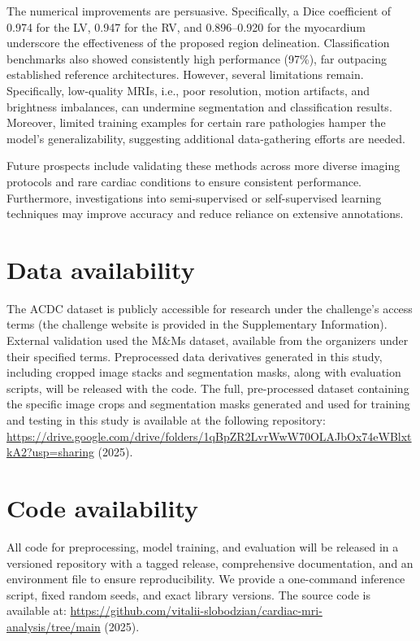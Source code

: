 \documentclass[fleqn,10pt]{wlscirep}
\begin{document}
The numerical improvements are persuasive. Specifically, a Dice coefficient of 0.974 for the LV, 0.947 for the RV, and 0.896--0.920 for the myocardium underscore the effectiveness of the proposed region delineation. Classification benchmarks also showed consistently high performance (97\%), far outpacing established reference architectures. However, several limitations remain. Specifically, low-quality MRIs, i.e., poor resolution, motion artifacts, and brightness imbalances, can undermine segmentation and classification results. Moreover, limited training examples for certain rare pathologies hamper the model's generalizability, suggesting additional data-gathering efforts are needed.

Future prospects include validating these methods across more diverse imaging protocols and rare cardiac conditions to ensure consistent performance. Furthermore, investigations into semi-supervised or self-supervised learning techniques may improve accuracy and reduce reliance on extensive annotations.

\section*{Data availability}
The ACDC dataset\cite{Bernard:2018} is publicly accessible for research under the challenge's access terms (the challenge website is provided in the Supplementary Information). External validation used the M\&Ms dataset\cite{Campello:2021}, available from the organizers under their specified terms. Preprocessed data derivatives generated in this study, including cropped image stacks and segmentation masks, along with evaluation scripts, will be released with the code. The full, pre-processed dataset containing the specific image crops and segmentation masks generated and used for training and testing in this study is available at the following repository: \url{https://drive.google.com/drive/folders/1qBpZR2LvrWwW70OLAJbOx74eWBlxtkA2?usp=sharing} (2025).

\section*{Code availability}
All code for preprocessing, model training, and evaluation will be released in a versioned repository with a tagged release, comprehensive documentation, and an environment file to ensure reproducibility. We provide a one-command inference script, fixed random seeds, and exact library versions. The source code is available at: \url{https://github.com/vitalii-slobodzian/cardiac-mri-analysis/tree/main} (2025).
\end{document}
